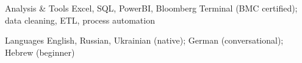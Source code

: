 

\begin{cvskills}

  \cvskill
    {Analysis \& Tools} %
    {Excel, SQL, PowerBI, Bloomberg Terminal (BMC certified); data cleaning, ETL, process automation} %

  \cvskill
    {Languages} %
    {English, Russian, Ukrainian (native); German (conversational); Hebrew (beginner)} %

\end{cvskills}
